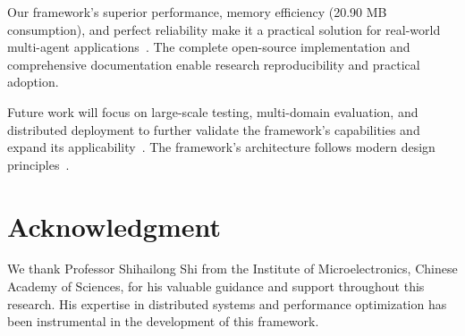 \documentclass[conference]{IEEEtran}
\begin{document}
Our framework's superior performance, memory efficiency (20.90 MB consumption), and perfect reliability make it a practical solution for real-world multi-agent applications~\cite{newman2021building,vernon2013implementing}. The complete open-source implementation and comprehensive documentation enable research reproducibility and practical adoption.

Future work will focus on large-scale testing, multi-domain evaluation, and distributed deployment to further validate the framework's capabilities and expand its applicability~\cite{multiagent_llm2024,distributed_ai2025,dsl_evolution2025,schmidhuber2015deep}. The framework's architecture follows modern design principles~\cite{kleppmann2017designing,richardson2018microservices}.

\section*{Acknowledgment}

We thank Professor Shihailong Shi from the Institute of Microelectronics, Chinese Academy of Sciences, for his valuable guidance and support throughout this research. His expertise in distributed systems and performance optimization has been instrumental in the development of this framework.



\end{document}
